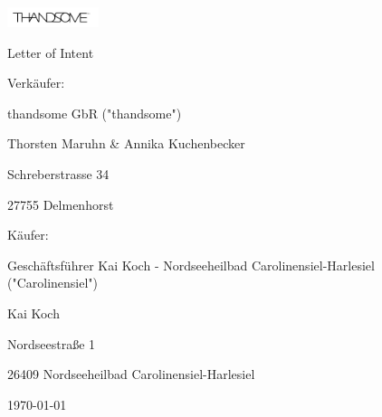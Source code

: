 \documentclass[a4paper,oneside,english,american,ngerman]{article}
\begin{document}
\begin{titlepage}
    \begin{flushright}
         \includegraphics[width=0.2\textwidth]{./pictures/logo.png}
    \end{flushright}
    
    \vspace{3cm}

    \begin{center}
        {\Large \color{stirlinggreen} Letter of Intent \par}
        \vspace{1cm}
        {\LARGE \color{stirlinggreen} Verkäufer:\par}
        {\LARGE \color{stirlinggreen} thandsome GbR ("thandsome") \par}
        {\color{stirlinggreen} Thorsten Maruhn \& Annika Kuchenbecker\par}
        {\color{stirlinggreen} Schreberstrasse 34 \par}
        {\color{stirlinggreen} 27755 Delmenhorst \par}

        \vspace{1cm}
        
        {\LARGE \color{stirlinggreen} Käufer: \par}
        {\LARGE \color{stirlinggreen} Geschäftsführer Kai Koch - Nordseeheilbad Carolinensiel-Harlesiel  ("Carolinensiel")  \par}
        {\color{stirlinggreen} Kai Koch \par}
        {\color{stirlinggreen} Nordseestraße 1 \par}
        {\color{stirlinggreen} 26409 Nordseeheilbad Carolinensiel-Harlesiel \par}


        {\large \color{stirlinggold} \today \par}
    \end{center}
\end{titlepage}
\end{document}
